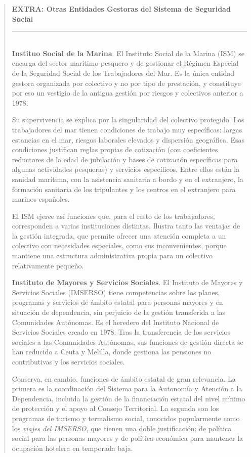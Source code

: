 \documentclass[10pt,a4paper]{article}
\newenvironment{specialblock}[1]{%
      \begin{quote} %
      \small %
      \noindent\textbf{#1}\\[-0.3em] %
      \rule{\linewidth}{0.4pt}\\[0.6em]}{
      \end{quote}}
\begin{document}
\begin{specialblock}{\textbf{EXTRA:} Otras Entidades Gestoras del Sistema de Seguridad Social}
    \textbf{Instituo Social de la Marina}. El Instituto Social de la Marina (ISM) se encarga del sector marítimo-pesquero y de gestionar el Régimen Especial de la Seguridad Social de los Trabajadores del Mar. Es la única entidad gestora organizada por colectivo y no por tipo de prestación, y constituye por eso un vestigio de la antigua gestión por riesgos y colectivos anterior a 1978.

    Su supervivencia se explica por la singularidad del colectivo protegido. Los trabajadores del mar tienen condiciones de trabajo muy específicas: largas estancias en el mar, riesgos laborales elevados y dispersión geográfica. Esas condiciones justifican reglas propias de cotización (con coeficientes reductores de la edad de jubilación y bases de cotización específicas para algunas actividades pesqueras) y servicios específicos. Entre ellos están la sanidad marítima, con la asistencia sanitaria a bordo y en el extranjero, la formación sanitaria de los tripulantes y los centros en el extranjero para marinos españoles. 
    
    El ISM ejerce así funciones que, para el resto de los trabajadores, corresponden a varias instituciones distintas. Ilustra tanto las ventajas de la gestión integrada, que permite ofrecer una atención completa a un colectivo con necesidades especiales, como sus inconvenientes, porque mantiene una estructura administrativa propia para un colectivo relativamente pequeño.

    \textbf{Instituto de Mayores y Servicios Sociales}. El Instituto de Mayores y Servicios Sociales (IMSERSO) tiene competencias sobre los planes, programas y servicios de ámbito estatal para personas mayores y en situación de dependencia, sin perjuicio de la gestión transferida a las Comunidades Autónomas. Es el heredero del Instituto Nacional de Servicios Sociales creado en 1978. Tras la transferencia de los servicios sociales a las Comunidades Autónomas, sus funciones de gestión directa se han reducido a Ceuta y Melilla, donde gestiona las pensiones no contributivas y los servicios sociales. 

    Conserva, en cambio, funciones de ámbito estatal de gran relevancia. La primera es la coordinación del Sistema para la Autonomía y Atención a la Dependencia, incluida la gestión de la financiación estatal del nivel mínimo de protección y el apoyo al Consejo Territorial. La segunda son los programas de turismo y termalismo social, conocidos popularmente como los \textit{viajes del IMSERSO}, que tienen una doble justificación: de política social para las personas mayores y de política económica para mantener la ocupación hotelera en temporada baja. 
    

\end{specialblock}
\end{document}
